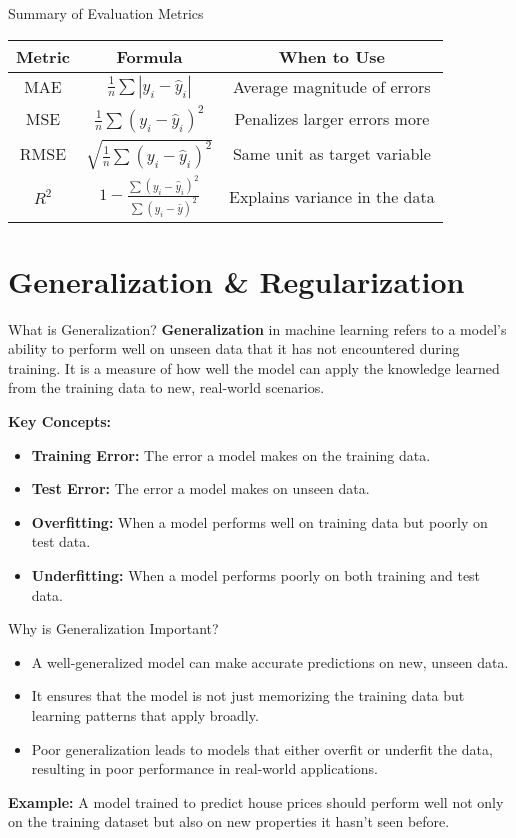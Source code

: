 \documentclass[serif, aspectratio=169]{beamer}
\begin{document}
\begin{frame}{Summary of Evaluation Metrics}
\begin{table}[]
\centering
\begin{tabular}{|c|c|c|}
\hline
\textbf{Metric} & \textbf{Formula} & \textbf{When to Use} \\
\hline
MAE & $\frac{1}{n} \sum |y_i - \hat{y}_i|$ & Average magnitude of errors \\
MSE & $\frac{1}{n} \sum (y_i - \hat{y}_i)^2$ & Penalizes larger errors more \\
RMSE & $\sqrt{\frac{1}{n} \sum (y_i - \hat{y}_i)^2}$ & Same unit as target variable \\
$R^2$ & $1 - \frac{\sum (y_i - \hat{y}_i)^2}{\sum (y_i - \bar{y})^2}$ & Explains variance in the data \\
\hline
\end{tabular}
\end{table}
\end{frame}

\section{Generalization & Regularization}
\begin{frame}{What is Generalization?}
\textbf{Generalization} in machine learning refers to a model's ability to perform well on unseen data that it has not encountered during training. It is a measure of how well the model can apply the knowledge learned from the training data to new, real-world scenarios.

\vspace{0.5cm}
\textbf{Key Concepts:}
\begin{itemize}
    \item \textbf{Training Error:} The error a model makes on the training data.
    \item \textbf{Test Error:} The error a model makes on unseen data.
    \item \textbf{Overfitting:} When a model performs well on training data but poorly on test data.
    \item \textbf{Underfitting:} When a model performs poorly on both training and test data.
\end{itemize}
\end{frame}

\begin{frame}{Why is Generalization Important?}
\begin{itemize}
    \item A well-generalized model can make accurate predictions on new, unseen data.
    \item It ensures that the model is not just memorizing the training data but learning patterns that apply broadly.
    \item Poor generalization leads to models that either overfit or underfit the data, resulting in poor performance in real-world applications.
\end{itemize}

\textbf{Example:} A model trained to predict house prices should perform well not only on the training dataset but also on new properties it hasn't seen before.
\end{frame}
\end{document}

